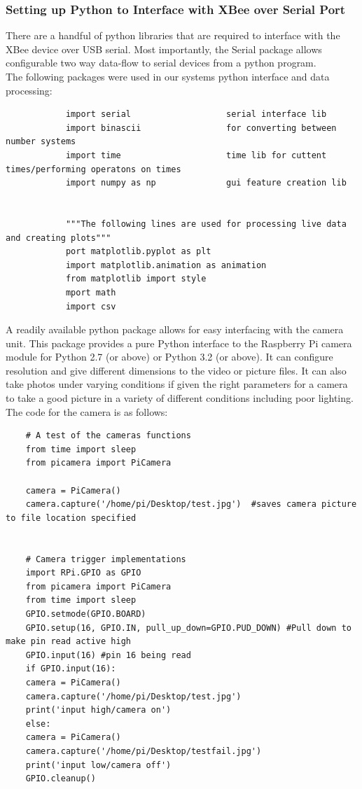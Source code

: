 	\subsubsection{Setting up Python to Interface with XBee over Serial Port}
		\par There are a handful of python libraries that are required to interface with the XBee device over USB serial. Most importantly, the Serial package allows configurable two way data-flow to serial devices from a python program.\\
		The following packages were used in our systems python interface and data processing:\\
		\begin{lstlisting}
			import serial					serial interface lib			
			import binascii					for converting between number systems	
			import time						time lib for cuttent times/performing operatons on times
			import numpy as np				gui feature creation lib					
			
			
			"""The following lines are used for processing live data and creating plots"""
			port matplotlib.pyplot as plt			
			import matplotlib.animation as animation		
			from matplotlib import style		
			mport math
			import csv
		\end{lstlisting}
	\par A readily available python package allows for easy interfacing with the camera unit. This package provides a pure Python interface to the Raspberry Pi camera module for Python 2.7 (or above) or Python 3.2 (or above). It can configure resolution and give different dimensions to the video or picture files. It can also take photos under varying conditions if given the right parameters for a camera to take a good picture in a variety of different conditions including poor lighting. 
	The code for the camera is as follows:
	\begin{lstlisting}
	# A test of the cameras functions
	from time import sleep
	from picamera import PiCamera
	
	camera = PiCamera()
	camera.capture('/home/pi/Desktop/test.jpg')  #saves camera picture to file location specified
	
	
	# Camera trigger implementations
	import RPi.GPIO as GPIO
	from picamera import PiCamera
	from time import sleep
	GPIO.setmode(GPIO.BOARD)
	GPIO.setup(16, GPIO.IN, pull_up_down=GPIO.PUD_DOWN) #Pull down to make pin read active high
	GPIO.input(16) #pin 16 being read
	if GPIO.input(16):
	camera = PiCamera()
	camera.capture('/home/pi/Desktop/test.jpg')
	print('input high/camera on')
	else:
	camera = PiCamera()
	camera.capture('/home/pi/Desktop/testfail.jpg')
	print('input low/camera off')
	GPIO.cleanup()
	\end{lstlisting}
